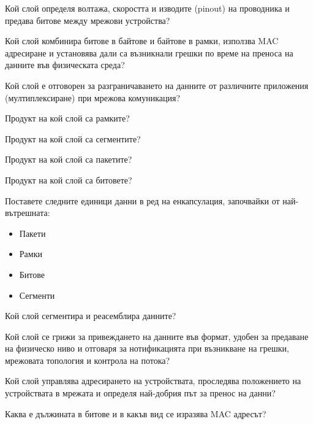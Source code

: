 \begin{q}
  Кой слой определя волтажа, скоростта и изводите (pinout) на проводника и
  предава битове между мрежови устройства?
\end{q}

\begin{q}
  Кой слой комбинира битове в байтове и байтове в рамки, използва MAC адресиране
  и установява дали са възникнали грешки по време на преноса на данните във
  физическата среда?
\end{q}

\begin{q}
  Кой слой е отговорен за разграничаването на данните от различните приложения
  (мултиплексиране) при мрежова комуникация?
\end{q}

\begin{q}
  Продукт на кой слой са рамките?
\end{q}

\begin{q}
  Продукт на кой слой са сегментите?
\end{q}

\begin{q}
  Продукт на кой слой са пакетите?
\end{q}

\begin{q}
  Продукт на кой слой са битовете?
\end{q}

\begin{q}
  Поставете следните единици данни в ред на енкапсулация, започвайки от
  най-вътрешната:

  \begin{itemize}
  \item Пакети
  \item Рамки
  \item Битове
  \item Сегменти
  \end{itemize}
\end{q}

\begin{q}
  Кой слой сегментира и реасемблира данните?
\end{q}

\begin{q}
  Кой слой се грижи за привеждането на данните във формат, удобен за предаване
  на физическо ниво и отговаря за нотификацията при възникване на грешки,
  мрежовата топология и контрола на потока?
\end{q}

\begin{q}
  Кой слой управлява адресирането на устройствата, проследява положението на
  устройствата в мрежата и определя най-добрия път за пренос на данни?
\end{q}

\begin{q}
  Каква е дължината в битове и в какъв вид се изразява MAC адресът?
\end{q}